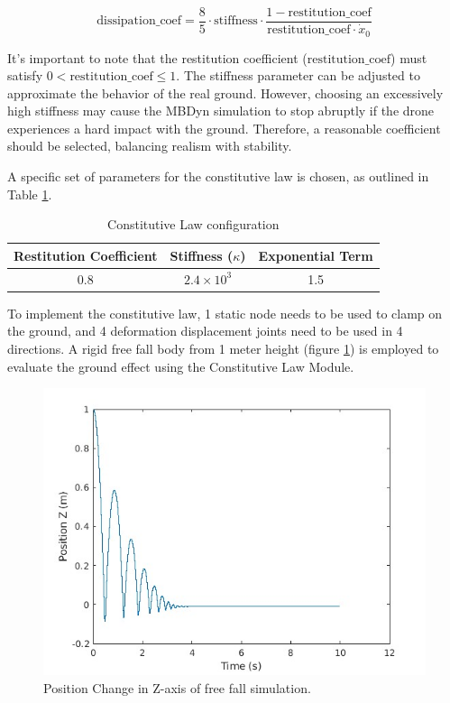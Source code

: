 \begin{equation}
    \text{dissipation\_coef} = \frac{8}{5} \cdot \text{stiffness} \cdot \frac{1 - \text{restitution\_coef}}{\text{restitution\_coef} \cdot \dot{x}_0}
\end{equation}

It's important to note that the restitution coefficient (\(\text{restitution\_coef}\)) must satisfy \(0 < \text{restitution\_coef} \leq 1\). The stiffness parameter can be adjusted to approximate the behavior of the real ground. However, choosing an excessively high stiffness may cause the MBDyn simulation to stop abruptly if the drone experiences a hard impact with the ground. Therefore, a reasonable coefficient should be selected, balancing realism with stability.

A specific set of parameters for the constitutive law is chosen, as outlined in Table \ref{tab:Constitutive_law}.

\begin{table}[h]
    \centering
    \begin{tabular}{ccc}
    \hline
    Restitution Coefficient & Stiffness (\(\kappa\)) & Exponential Term \\
    \hline
    0.8 & \(2.4 \times 10^3\) & 1.5 \\
    \hline
    \end{tabular}
    \caption{Constitutive Law configuration}
    \label{tab:Constitutive_law}
\end{table}

To implement the constitutive law, 1 static node needs to be used to clamp on the ground, and 4 deformation displacement joints need to be used in 4 directions. A rigid free fall body from 1 meter height (figure \ref{fig:freefall}) is employed to evaluate the ground effect using the Constitutive Law Module.

\begin{figure}
    \centering
    \includegraphics[width=0.5\linewidth]{Images/freefall.jpg}
    \caption{Position Change in Z-axis of free fall simulation.}
    \label{fig:freefall}
\end{figure}


